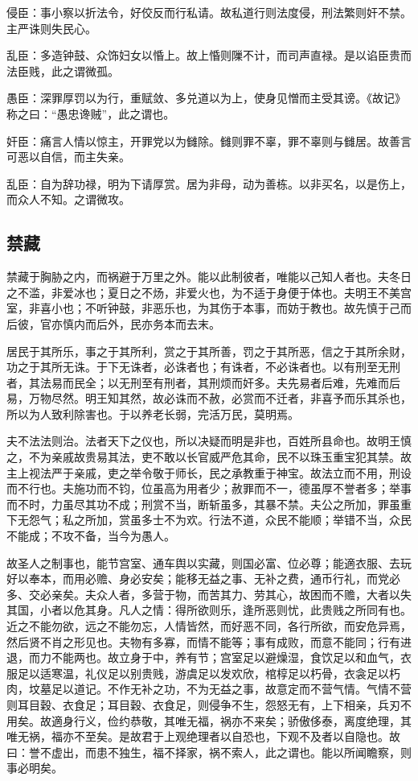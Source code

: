 \documentclass[]{article}
\begin{document}
侵臣：事小察以折法令，好佼反而行私请。故私道行则法度侵，刑法繁则奸不禁。主严诛则失民心。

乱臣：多造钟鼓、众饰妇女以惛上。故上惛则隟不计，而司声直禄。是以谄臣贵而法臣贱，此之谓微孤。

愚臣：深罪厚罚以为行，重赋敛、多兑道以为上，使身见憎而主受其谤。《故记》称之曰：``愚忠谗贼''，此之谓也。

奸臣：痛言人情以惊主，开罪党以为雠除。雠则罪不辜，罪不辜则与雠居。故善言可恶以自信，而主失亲。

乱臣：自为辞功禄，明为下请厚赏。居为非母，动为善栋。以非买名，以是伤上，而众人不知。之谓微攻。

\hypertarget{header-n688}{%
\subsection{禁藏}\label{header-n688}}

禁藏于胸胁之内，而祸避于万里之外。能以此制彼者，唯能以己知人者也。夫冬日之不滥，非爱冰也；夏日之不炀，非爱火也，为不适于身便于体也。夫明王不美宫室，非喜小也；不听钟鼓，非恶乐也，为其伤于本事，而妨于教也。故先慎于己而后彼，官亦慎内而后外，民亦务本而去末。

居民于其所乐，事之于其所利，赏之于其所善，罚之于其所恶，信之于其所余财，功之于其所无诛。于下无诛者，必诛者也；有诛者，不必诛者也。以有刑至无刑者，其法易而民全；以无刑至有刑者，其刑烦而奸多。夫先易者后难，先难而后易，万物尽然。明王知其然，故必诛而不赦，必赏而不迁者，非喜予而乐其杀也，所以为人致利除害也。于以养老长弱，完活万民，莫明焉。

夫不法法则治。法者天下之仪也，所以决疑而明是非也，百姓所县命也。故明王慎之，不为亲戚故贵易其法，吏不敢以长官威严危其命，民不以珠玉重宝犯其禁。故主上视法严于亲戚，吏之举令敬于师长，民之承教重于神宝。故法立而不用，刑设而不行也。夫施功而不钧，位虽高为用者少；赦罪而不一，德虽厚不誉者多；举事而不时，力虽尽其功不成；刑赏不当，断斩虽多，其暴不禁。夫公之所加，罪虽重下无怨气；私之所加，赏虽多士不为欢。行法不道，众民不能顺；举错不当，众民不能成；不攻不备，当今为愚人。

故圣人之制事也，能节宫室、通车舆以实藏，则国必富、位必尊；能適衣服、去玩好以奉本，而用必赡、身必安矣；能移无益之事、无补之费，通币行礼，而党必多、交必亲矣。夫众人者，多营于物，而苦其力、劳其心，故困而不赡，大者以失其国，小者以危其身。凡人之情：得所欲则乐，逢所恶则忧，此贵贱之所同有也。近之不能勿欲，远之不能勿忘，人情皆然，而好恶不同，各行所欲，而安危异焉，然后贤不肖之形见也。夫物有多寡，而情不能等；事有成败，而意不能同；行有进退，而力不能两也。故立身于中，养有节；宫室足以避燥湿，食饮足以和血气，衣服足以适寒温，礼仪足以别贵贱，游虞足以发欢欣，棺椁足以朽骨，衣衾足以朽肉，坟墓足以道记。不作无补之功，不为无益之事，故意定而不营气情。气情不营则耳目穀、衣食足；耳目穀、衣食足，则侵争不生，怨怒无有，上下相亲，兵刃不用矣。故適身行义，俭约恭敬，其唯无福，祸亦不来矣；骄傲侈泰，离度绝理，其唯无祸，福亦不至矣。是故君于上观绝理者以自恐也，下观不及者以自隐也。故曰：誉不虚出，而患不独生，福不择家，祸不索人，此之谓也。能以所闻瞻察，则事必明矣。
\end{document}
